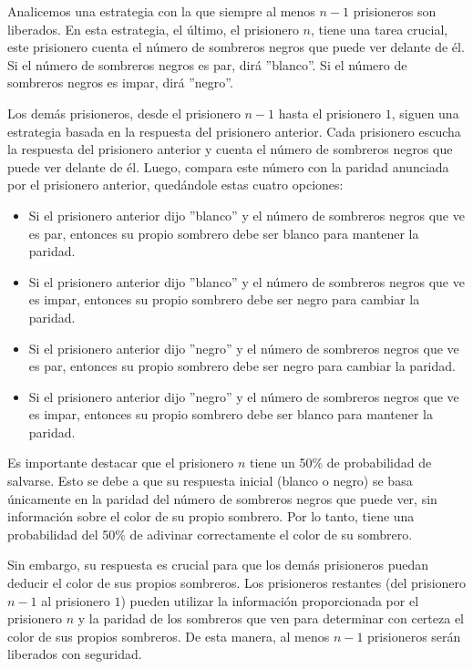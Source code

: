 Analicemos una estrategia con la que siempre al menos $n - 1$ prisioneros son liberados. En esta estrategia, el último, el prisionero $n$, tiene una tarea crucial, este prisionero cuenta el número de sombreros negros que puede ver delante de él. Si el número de sombreros negros es par, dirá ''blanco''. Si el número de sombreros negros es impar, dirá ''negro''.

Los demás prisioneros, desde el prisionero $n - 1$ hasta el prisionero $1$, siguen una estrategia basada en la respuesta del prisionero anterior. Cada prisionero escucha la respuesta del prisionero anterior y cuenta el número de sombreros negros que puede ver delante de él. Luego, compara este número con la paridad anunciada por el prisionero anterior, quedándole estas cuatro opciones:

 \begin{itemize}
    \item Si el prisionero anterior dijo ''blanco'' y el número de sombreros negros que ve es par, entonces su propio sombrero debe ser blanco para mantener la paridad.
    \item Si el prisionero anterior dijo ''blanco'' y el número de sombreros negros que ve es impar, entonces su propio sombrero debe ser negro para cambiar la paridad.
    \item Si el prisionero anterior dijo ''negro'' y el número de sombreros negros que ve es par, entonces su propio sombrero debe ser negro para cambiar la paridad.
    \item Si el prisionero anterior dijo ''negro'' y el número de sombreros negros que ve es impar, entonces su propio sombrero debe ser blanco para mantener la paridad.
\end{itemize}

Es importante destacar que el prisionero $n$ tiene un 50\% de probabilidad de salvarse. Esto se debe a que su respuesta inicial (blanco o negro) se basa únicamente en la paridad del número de sombreros negros que puede ver, sin información sobre el color de su propio sombrero. Por lo tanto, tiene una probabilidad del 50\% de adivinar correctamente el color de su sombrero.

Sin embargo, su respuesta es crucial para que los demás prisioneros puedan deducir el color de sus propios sombreros. Los prisioneros restantes (del prisionero $n - 1$ al prisionero $1$) pueden utilizar la información proporcionada por el prisionero $n$ y la paridad de los sombreros que ven para determinar con certeza el color de sus propios sombreros. De esta manera, al menos $n - 1$ prisioneros serán liberados con seguridad.
